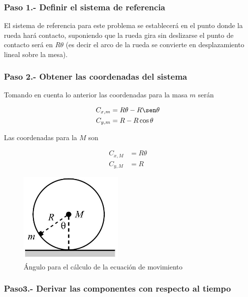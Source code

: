 \documentclass[12pt]{book}
\theoremstyle{definition}
\theoremstyle{remark}
\theoremstyle{plain}
\begin{document}
\subsubsection{Paso 1.- Definir el sistema de referencia}

El sistema de referencia para este problema se establecerá en el punto donde la rueda hará contacto, suponiendo que la rueda gira sin deslizarse el punto de contacto será en $R \theta$ (es decir el arco de la rueda se convierte en desplazamiento lineal sobre la mesa). 

\subsubsection{Paso 2.- Obtener las coordenadas del sistema }

Tomando en cuenta lo anterior las coordenadas para la masa $m$ serán 

\begin{equation}
\label{equ023}
\begin{aligned}
C_{x,m} & =R \theta - R \sen \theta \\
C_{y,m} & =R- R \cos \theta
\end{aligned}
\end{equation}

Las coordenadas para la $M$ son

\begin{equation}
\label{equ024}
\begin{aligned}
C_{x,M} & =R \theta  \\
C_{y,M} & =R
\end{aligned}
\end{equation}

\begin{figure}
\centering
\includegraphics[width=2in]{Angulorueda.jpeg}
\caption{Ángulo para el cálculo de la ecuación de movimiento}
\label{fig102}
\end{figure}

\subsubsection{Paso3.-  Derivar las componentes con respecto al tiempo}
\end{document}
